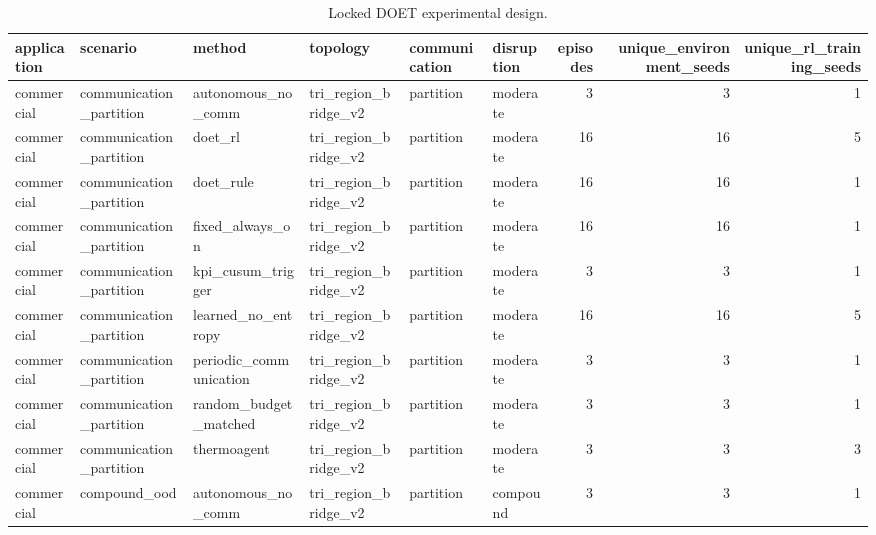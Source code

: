 \begin{table}
\centering
\caption{Locked DOET experimental design.}
\begin{tabular}{llllllrrr}
\toprule
 application &                scenario &                 method &             topology & communication & disruption &  episodes &  unique\_environment\_seeds &  unique\_rl\_training\_seeds \\
\midrule
  commercial & communication\_partition &     autonomous\_no\_comm & tri\_region\_bridge\_v2 &     partition &   moderate &         3 &                         3 &                         1 \\
  commercial & communication\_partition &                doet\_rl & tri\_region\_bridge\_v2 &     partition &   moderate &        16 &                        16 &                         5 \\
  commercial & communication\_partition &              doet\_rule & tri\_region\_bridge\_v2 &     partition &   moderate &        16 &                        16 &                         1 \\
  commercial & communication\_partition &        fixed\_always\_on & tri\_region\_bridge\_v2 &     partition &   moderate &        16 &                        16 &                         1 \\
  commercial & communication\_partition &      kpi\_cusum\_trigger & tri\_region\_bridge\_v2 &     partition &   moderate &         3 &                         3 &                         1 \\
  commercial & communication\_partition &     learned\_no\_entropy & tri\_region\_bridge\_v2 &     partition &   moderate &        16 &                        16 &                         5 \\
  commercial & communication\_partition & periodic\_communication & tri\_region\_bridge\_v2 &     partition &   moderate &         3 &                         3 &                         1 \\
  commercial & communication\_partition &  random\_budget\_matched & tri\_region\_bridge\_v2 &     partition &   moderate &         3 &                         3 &                         1 \\
  commercial & communication\_partition &            thermoagent & tri\_region\_bridge\_v2 &     partition &   moderate &         3 &                         3 &                         3 \\
  commercial &            compound\_ood &     autonomous\_no\_comm & tri\_region\_bridge\_v2 &     partition &   compound &         3 &                         3 &                         1 \\

\end{tabular}
\end{table}
